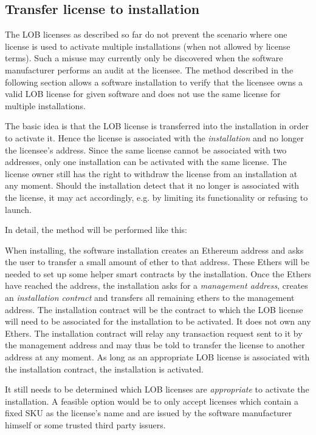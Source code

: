 \documentclass[a4paper]{article}
\begin{document}
\subsection{Transfer license to installation}
\label{ch:installationContract}

The LOB licenses as described so far do not prevent the scenario where one license is used to activate multiple installations (when not allowed by license terms). Such a misuse may currently only be discovered when the software manufacturer performs an audit at the licensee. The method described in the following section allows a software installation to verify that the licensee owns a valid LOB license for given software and does not use the same license for multiple installations.

The basic idea is that the LOB license is transferred into the installation in order to activate it. Hence the license is associated with the \emph{installation} and no longer the licensee's address. Since the same license cannot be associated with two addresses, only one installation can be activated with the same license. The license owner still has the right to withdraw the license from an installation at any moment. Should the installation detect that it no longer is associated with the license, it may act accordingly, e.g. by limiting its functionality or refusing to launch.

In detail, the method will be performed like this:

When installing, the software installation creates an Ethereum address and asks the user to transfer a small amount of ether to that address. These Ethers will be needed to set up some helper smart contracts by the installation. Once the Ethers have reached the address, the installation asks for a \emph{management address}, creates an \emph{installation contract} and transfers all remaining ethers to the management address. The installation contract will be the contract to which the LOB license will need to be associated for the installation to be activated. It does not own any Ethers. The installation contract will relay any transaction request sent to it by the management address and may thus be told to transfer the license to another address at any moment. As long as an appropriate LOB license is associated with the installation contract, the installation is activated.

It still needs to be determined which LOB licenses are \emph{appropriate} to activate the installation. A feasible option would be to only accept licenses which contain a fixed SKU as the license's name and are issued by the software manufacturer himself or some trusted third party issuers.
\end{document}
